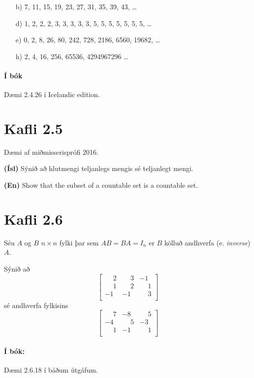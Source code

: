 \documentclass{article}
\begin{document}
\begin{itemize}
    \item[b)] 7, 11, 15, 19, 23, 27, 31, 35, 39, 43, \ldots
    \item[d)] 1, 2, 2, 2, 3, 3, 3, 3, 3, 5, 5, 5, 5, 5, 5, 5, \ldots
    \item[e)] 0, 2, 8, 26, 80, 242, 728, 2186, 6560, 19682, \ldots
    \item[h)] 2, 4, 16, 256, 65536, 4294967296 \ldots
\end{itemize}

\paragraph{Í bók} Dæmi 2.4.26 í Icelandic edition.

\section{Kafli 2.5}

\question

Dæmi af miðmisserisprófi 2016.

\textbf{(Ísl)} Sýnið að hlutmengi teljanlegs mengis sé teljanlegt mengi.

\textbf{(En)} Show that the subset of a countable set is a countable set.

\section{Kafli 2.6}

\question Séu $A$ og $B$ $n \times n$ fylki þar sem $AB = BA = I_n$ er $B$ kölluð andhverfa (e. \emph{inverse}) $A$.

Sýnið að 
\[
    \begin{bmatrix}
        \phantom{-}2&\phantom{-}3&-1\\
        \phantom{-}1&\phantom{-}2&\phantom{-}1\\
        -1&-1&\phantom{-}3\\
    \end{bmatrix}
\]
sé andhverfa fylkisins
\[
    \begin{bmatrix}
        \phantom{-}7&-8&\phantom{-}5\\
        -4&\phantom{-}5&-3\\
        \phantom{-}1&-1&\phantom{-}1\\        
    \end{bmatrix}
\]

\paragraph{Í bók:} Dæmi 2.6.18 í báðum útgáfum.
\end{document}
